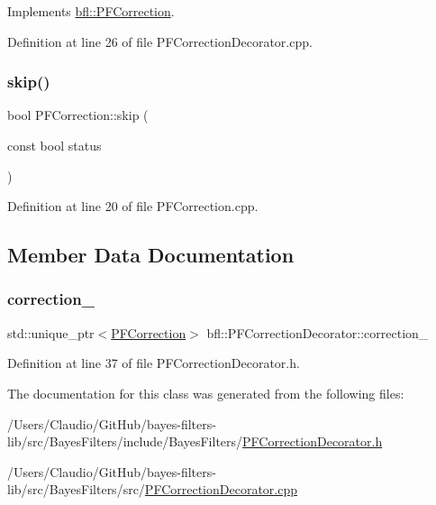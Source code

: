 Implements \mbox{\hyperlink{classbfl_1_1PFCorrection_a9844514568f65a0e5fa2cffadea460c6}{bfl\+::\+P\+F\+Correction}}.



Definition at line 26 of file P\+F\+Correction\+Decorator.\+cpp.

\mbox{\label{classbfl_1_1PFCorrection_ab25e625ea12fe257e0eb85d465835e62}} 
\subsubsection{\texorpdfstring{skip()}{skip()}}
{\footnotesize\ttfamily bool P\+F\+Correction\+::skip (\begin{DoxyParamCaption}\item[{const bool}]{status }\end{DoxyParamCaption})\hspace{0.3cm}{\ttfamily [inherited]}}



Definition at line 20 of file P\+F\+Correction.\+cpp.



\subsection{Member Data Documentation}
\mbox{\label{classbfl_1_1PFCorrectionDecorator_ac4a59d72d92138a22ca7894588b54c6a}} 
\subsubsection{\texorpdfstring{correction\+\_\+}{correction\_}}
{\footnotesize\ttfamily std\+::unique\+\_\+ptr$<$\mbox{\hyperlink{classbfl_1_1PFCorrection}{P\+F\+Correction}}$>$ bfl\+::\+P\+F\+Correction\+Decorator\+::correction\+\_\+\hspace{0.3cm}{\ttfamily [private]}}



Definition at line 37 of file P\+F\+Correction\+Decorator.\+h.



The documentation for this class was generated from the following files\+:\begin{DoxyCompactItemize}
\item 
/\+Users/\+Claudio/\+Git\+Hub/bayes-\/filters-\/lib/src/\+Bayes\+Filters/include/\+Bayes\+Filters/\mbox{\hyperlink{PFCorrectionDecorator_8h}{P\+F\+Correction\+Decorator.\+h}}\item 
/\+Users/\+Claudio/\+Git\+Hub/bayes-\/filters-\/lib/src/\+Bayes\+Filters/src/\mbox{\hyperlink{PFCorrectionDecorator_8cpp}{P\+F\+Correction\+Decorator.\+cpp}}\end{DoxyCompactItemize}

